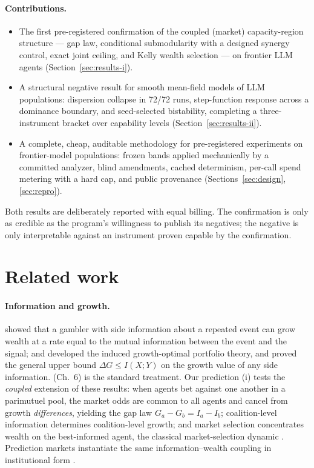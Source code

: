 \documentclass{article} %
\begin{document}
\paragraph{Contributions.}
\begin{itemize}
\item The first pre-registered confirmation of the coupled (market) capacity-region structure --- gap law, conditional submodularity with a designed synergy control, exact joint ceiling, and Kelly wealth selection --- on frontier LLM agents (Section~\ref{sec:results-i}).
\item A structural negative result for smooth mean-field models of LLM populations: dispersion collapse in 72/72 runs, step-function response across a dominance boundary, and seed-selected bistability, completing a three-instrument bracket over capability levels (Section~\ref{sec:results-ii}).
\item A complete, cheap, auditable methodology for pre-registered experiments on frontier-model populations: frozen bands applied mechanically by a committed analyzer, blind amendments, cached determinism, per-call spend metering with a hard cap, and public provenance (Sections~\ref{sec:design}, \ref{sec:repro}).
\end{itemize}

Both results are deliberately reported with equal billing. The confirmation is only as credible as the program's willingness to publish its negatives; the negative is only interpretable against an instrument proven capable by the confirmation.

\section{Related work}
\label{sec:related}

\paragraph{Information and growth.} \citet{kelly1956} showed that a gambler with side information about a repeated event can grow wealth at a rate equal to the mutual information between the event and the signal; \citet{breiman1961} and \citet{cover1991} developed the induced growth-optimal portfolio theory, and \citet{barron1988} proved the general upper bound $\Delta G \leq I(X;Y)$ on the growth value of any side information. \citet{cover2006} (Ch.~6) is the standard treatment. Our prediction (i) tests the \emph{coupled} extension of these results: when agents bet against one another in a parimutuel pool, the market odds are common to all agents and cancel from growth \emph{differences}, yielding the gap law $G_a - G_b = I_a - I_b$; coalition-level information determines coalition-level growth; and market selection concentrates wealth on the best-informed agent, the classical market-selection dynamic \citep{blume1992,sandroni2000}. Prediction markets instantiate the same information--wealth coupling in institutional form \citep{hanson2003,wolfers2004}.
\end{document}
